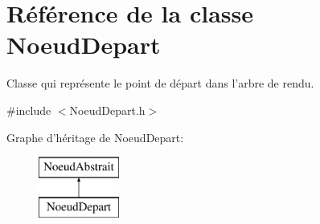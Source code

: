 \hypertarget{class_noeud_depart}{\section{Référence de la classe Noeud\-Depart}
\label{class_noeud_depart}
}


Classe qui représente le point de départ dans l'arbre de rendu.  




{\ttfamily \#include $<$Noeud\-Depart.\-h$>$}

Graphe d'héritage de Noeud\-Depart\-:\begin{figure}[H]
\begin{center}
\leavevmode
\includegraphics[height=2.000000cm]{class_noeud_depart}
\end{center}
\end{figure}
